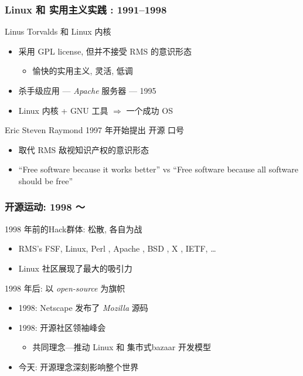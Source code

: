 \documentclass[compress]{beamer}
\begin{document}
\begin{frame}
\frametitle{Linux 和 实用主义实践 : 1991--1998}
\begin{block}{ Linus Torvalds 和 Linux 内核 }
\begin{itemize}
\item 采用 GPL license, 但并不接受 RMS 的意识形态
    \begin{itemize}
    \item 愉快的实用主义, 灵活, 低调
    \end{itemize}
\item 杀手级应用 --- \emph{Apache} 服务器 --- 1995
\item Linux 内核 + GNU 工具 $\Longrightarrow$ 一个成功 OS
\end{itemize}
\end{block}
\begin{block}{ Eric Steven Raymond 1997 年开始提出 开源 口号}
\begin{itemize}
\item 取代 RMS 敌视知识产权的意识形态
\item ``Free software
because it works better'' vs ``Free software because all software
should be free''
\end{itemize}
\end{block}
\end{frame}

\begin{frame}
\frametitle{开源运动: 1998 ～ }
\begin{block} {1998 年前的Hack群体: 松散, 各自为战}
\begin{itemize}
    \item RMS's FSF, Linux, Perl , Apache
    , BSD , X , IETF, \ldots
    \item Linux 社区展现了最大的吸引力
\end{itemize}
\end{block}

\begin{block}{ 1998 年后: 以 \emph{open-source} 为旗帜}
\begin{itemize}
\item 1998: Netscape 发布了 \emph{Mozilla} 源码
\item 1998: 开源社区领袖峰会
    \begin{itemize}
        \item 共同理念---推动 Linux 和 集市式{bazaar} 开发模型
    \end{itemize}
\item 今天: 开源理念深刻影响整个世界
\end{itemize}
\end{block}

\end{frame}
\end{document}
